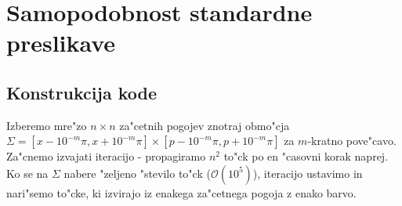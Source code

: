 \documentclass[]{article}
\begin{document}
\section{Samopodobnost standardne preslikave}

\subsection{Konstrukcija kode}
Izberemo mre"zo $n\times n$ za"cetnih pogojev znotraj obmo"cja $\Sigma=[x-10^{-m}\pi,x+10^{-m}\pi]\times[p-10^{-m}\pi,p+10^{-m}\pi]$ za $m$-kratno pove"cavo. Za"cnemo izvajati iteracijo - propagiramo $n^2$ to"ck po en "casovni korak naprej. Ko se na $\Sigma$ nabere "zeljeno "stevilo to"ck ($\mathcal{O}(10^5)$), iteracijo ustavimo in nari"semo to"cke, ki izvirajo iz enakega za"cetnega pogoja z enako barvo.
\end{document}
